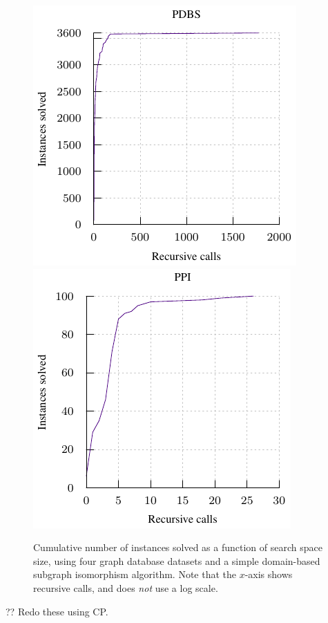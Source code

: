 \documentclass[twoside,11pt]{article}
\begin{document}
\begin{figure}[t]
    \centering
    \hspace*{1em}
    \includegraphics*{plots/biiiig-data-pdbs.pdf}
    \hfill
    \includegraphics*{plots/biiiig-data-ppigo.pdf}
    \hspace*{1em}

    \caption{Cumulative number of instances solved as a function of search space size, using four
    graph database datasets and a simple domain-based subgraph isomorphism algorithm. Note that the
    $x$-axis shows recursive calls, and does \emph{not} use a log scale.}
    \label{figure:biiiig-data}
\end{figure}

?? Redo these using CP.
\end{document}
